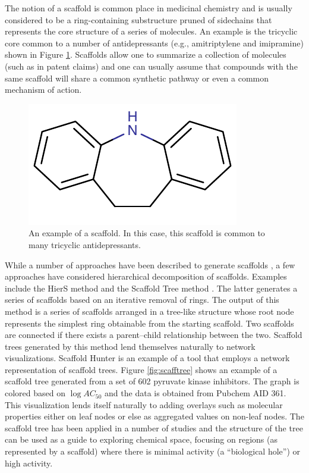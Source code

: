 \documentclass[]{book}
\begin{document}
The notion of a scaffold is common place in medicinal chemistry and is
usually considered to be a ring-containing substructure pruned of
sidechains that represents the core structure of a series of
molecules. An example is the tricyclic core common to a number of
antidepressants (e.g., amitriptylene and imipramine) shown in Figure
\ref{fig:tca-core}. Scaffolds allow one to summarize a collection of
molecules (such as in patent claims) and one can usually assume that
compounds with the same scaffold will share a common synthetic pathway
or even a common mechanism of action.
\begin{figure}[h]
  \centering
  \includegraphics{img/tca-core}
  \caption{An example of a scaffold. In this case, this
  scaffold is common to many tricyclic antidepressants.}
  \label{fig:tca-core}
\end{figure}


While a number of approaches have been described to generate scaffolds
\cite{Lewell:1998aa,Bemis:1996aa,Katritzky:2000wf}, a few approaches
have considered hierarchical decomposition of scaffolds. Examples
include the HierS method \cite{Wilkens:2005il} and the Scaffold Tree
method \cite{Schuffenhauer:2007oz}. The latter generates a series of
scaffolds based on an iterative removal of rings. The output of this
method is a series of scaffolds arranged in a tree-like structure
whose root node represents the simplest ring obtainable from the
starting scaffold.  Two scaffolds are connected if there exists a
parent--child relationship between the two. Scaffold trees generated
by this method lend themselves naturally to network
visualizations. Scaffold Hunter \cite{Wetzel:2009uq} is an example of
a tool that employs a network representation of scaffold trees. Figure
\ref{fig:scafftree} shows an example of a scaffold tree generated from
a set of 602 pyruvate kinase inhibitors. The graph is colored based on
$\log AC_{50}$ and the data is obtained from Pubchem AID 361. This
visualization lends itself naturally to adding overlays such as
molecular properties either on leaf nodes or else as aggregated values
on non-leaf nodes. The scaffold tree has been applied in a number of
studies \cite{Wetzel:2009uq,Renner:2009wm} and the structure of the
tree can be used as a guide to exploring chemical space, focusing on
regions (as represented by a scaffold) where there is minimal activity
(a ``biological hole'') or high activity.
\end{document}
